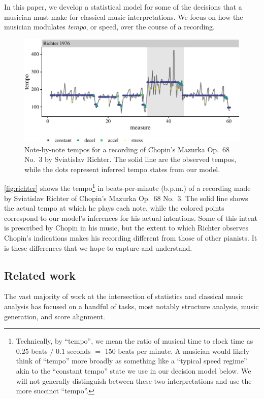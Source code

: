 \documentclass[aoas]{imsart}
\begin{document}
In this paper, we develop a statistical model for some of the
decisions that a musician must make for classical music
interpretations. We focus on how the musician modulates
{\it tempo}, or speed, over the course of a recording. 
\begin{figure}[t]
  \centering
  \includegraphics[width=.9\linewidth]{richter-1}
  \caption{Note-by-note tempos for a recording of Chopin's Mazurka
    Op.\ 68 No.\ 3 by Sviatislav Richter. The solid line are the
    observed tempos, while the dots represent inferred tempo states
    from our model. }
  \label{fig:richter}
\end{figure}
\autoref{fig:richter} shows the tempo\footnote{Technically, by
  ``tempo'', we mean the ratio of musical time to clock time as $0.25$
  beats $/$ $0.1$ seconds $=$ 150 beats per minute. A musician would
  likely think of ``tempo'' more broadly as something like a ``typical
  speed regime'' akin to the ``constant tempo'' state we use in our
  decision model below. We will not generally distinguish between
  these two interpretations and use the more succinct ``tempo''.}
  in beats-per-minute (b.p.m.) of
a recording made by Sviatislav Richter of Chopin's Mazurka Op.\ 68
No.\ 3. The solid line shows the actual tempo at which he plays each
note, while the colored points correspond to our model's inferences
for his actual intentions. Some of this intent is prescribed  by
Chopin in his music, but the extent to which Richter observes Chopin's
indications makes his recording different from those of other
pianists. It is these differences that we hope to capture and understand.

\subsection{Related work}
\label{sec:related-work}


 

The vast majority of work at the intersection of statistics
and classical music analysis has focused on a handful of tasks,
most notably structure analysis, music generation, and score
alignment.
\end{document}
